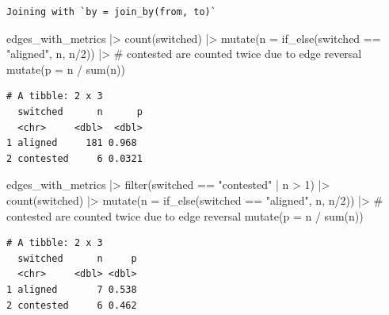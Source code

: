 \documentclass[
  letterpaper,
  DIV=11,
  numbers=noendperiod]{scrartcl}
\newenvironment{Shaded}{\begin{snugshade}}{\end{snugshade}}
\newcommand{\AttributeTok}[1]{\textcolor[rgb]{0.40,0.45,0.13}{#1}}
\newcommand{\CommentTok}[1]{\textcolor[rgb]{0.37,0.37,0.37}{#1}}
\newcommand{\DecValTok}[1]{\textcolor[rgb]{0.68,0.00,0.00}{#1}}
\newcommand{\FunctionTok}[1]{\textcolor[rgb]{0.28,0.35,0.67}{#1}}
\newcommand{\NormalTok}[1]{\textcolor[rgb]{0.00,0.23,0.31}{#1}}
\newcommand{\SpecialCharTok}[1]{\textcolor[rgb]{0.37,0.37,0.37}{#1}}
\newcommand{\StringTok}[1]{\textcolor[rgb]{0.13,0.47,0.30}{#1}}
\begin{document}
\begin{verbatim}
Joining with `by = join_by(from, to)`
\end{verbatim}

\begin{Shaded}
\begin{Highlighting}[]
\NormalTok{edges\_with\_metrics }\SpecialCharTok{|\textgreater{}} 
    \FunctionTok{count}\NormalTok{(switched) }\SpecialCharTok{|\textgreater{}} 
    \FunctionTok{mutate}\NormalTok{(}\AttributeTok{n =} \FunctionTok{if\_else}\NormalTok{(switched }\SpecialCharTok{==} \StringTok{"aligned"}\NormalTok{, n, n}\SpecialCharTok{/}\DecValTok{2}\NormalTok{)) }\SpecialCharTok{|\textgreater{}} \CommentTok{\# contested are counted twice due to edge reversal}
    \FunctionTok{mutate}\NormalTok{(}\AttributeTok{p =}\NormalTok{ n }\SpecialCharTok{/} \FunctionTok{sum}\NormalTok{(n))}
\end{Highlighting}
\end{Shaded}

\begin{verbatim}
# A tibble: 2 x 3
  switched      n      p
  <chr>     <dbl>  <dbl>
1 aligned     181 0.968 
2 contested     6 0.0321
\end{verbatim}

\begin{Shaded}
\begin{Highlighting}[]
\NormalTok{edges\_with\_metrics }\SpecialCharTok{|\textgreater{}} 
    \FunctionTok{filter}\NormalTok{(switched }\SpecialCharTok{==} \StringTok{"contested"} \SpecialCharTok{|}\NormalTok{ n }\SpecialCharTok{\textgreater{}} \DecValTok{1}\NormalTok{) }\SpecialCharTok{|\textgreater{}} 
    \FunctionTok{count}\NormalTok{(switched) }\SpecialCharTok{|\textgreater{}} 
    \FunctionTok{mutate}\NormalTok{(}\AttributeTok{n =} \FunctionTok{if\_else}\NormalTok{(switched }\SpecialCharTok{==} \StringTok{"aligned"}\NormalTok{, n, n}\SpecialCharTok{/}\DecValTok{2}\NormalTok{)) }\SpecialCharTok{|\textgreater{}} \CommentTok{\# contested are counted twice due to edge reversal}
    \FunctionTok{mutate}\NormalTok{(}\AttributeTok{p =}\NormalTok{ n }\SpecialCharTok{/} \FunctionTok{sum}\NormalTok{(n))}
\end{Highlighting}
\end{Shaded}

\begin{verbatim}
# A tibble: 2 x 3
  switched      n     p
  <chr>     <dbl> <dbl>
1 aligned       7 0.538
2 contested     6 0.462
\end{verbatim}
\end{document}
